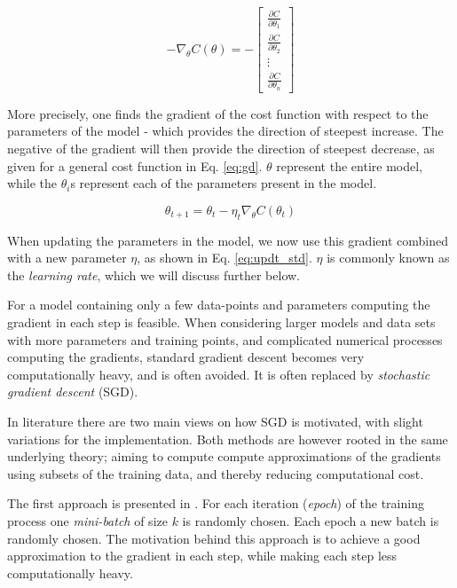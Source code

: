 \begin{equation}\label{eq:gd}
    -\nabla_\theta C(\theta) = -\begin{bmatrix}
\frac{\partial C}{\partial \theta_1} \\
\frac{\partial C}{\partial \theta_2} \\
\vdots \\
\frac{\partial C}{\partial \theta_n}
\end{bmatrix}
\end{equation}

More precisely, one finds the gradient of the cost function with respect to the parameters of the model - which provides the direction of steepest increase. The negative of the gradient will then provide the direction of steepest decrease, as given for a general cost function in Eq. \ref{eq:gd}. $\theta$ represent the entire model, while the $\theta_i$s represent each of the parameters present in the model.

\begin{equation}\label{eq:updt_std}
    \theta_{t+1} = \theta_t - \eta_t \nabla_{\theta} C(\theta_t)
\end{equation}

When updating the parameters in the model, we now use this gradient combined with a new parameter $\eta$, as shown in Eq. \ref{eq:updt_std}.
$\eta$ is commonly known as the \textit{learning rate}, which we will discuss further below.

For a model containing only a few data-points and parameters computing the gradient in each step is feasible.
When considering larger models and data sets with more parameters and training points, and complicated numerical processes computing the gradients, standard gradient descent becomes very computationally heavy, and is often avoided.
It is often replaced by \textit{stochastic gradient descent} (SGD).

In literature there are two main views on how SGD is motivated, with slight variations for the implementation.
Both methods are however rooted in the same underlying theory; aiming to compute compute approximations of the gradients using subsets of the training data, and thereby reducing computational cost.

The first approach is presented in \textcite[p. 291]{Goodfellow-et-al-2016}. For each iteration (\textit{epoch}) of the training process one \textit{mini-batch} of size $k$ is randomly chosen. Each epoch a new batch is randomly chosen. 
The motivation behind this approach is to achieve a good approximation to the gradient in each step, while making each step less computationally heavy.


